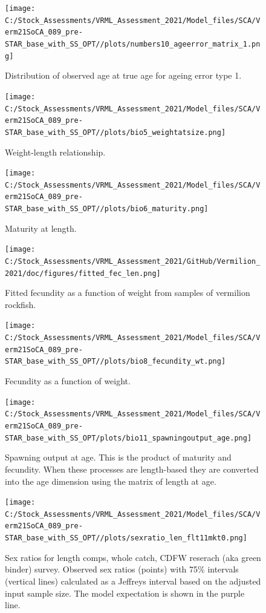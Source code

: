 \documentclass[
  english,
  a4paper,
]{article}
\begin{document}
\begin{figure}
\centering
\texttt{[image: C:/Stock\_Assessments/VRML\_Assessment\_2021/Model\_files/SCA/Verm21SoCA\_089\_pre-STAR\_base\_with\_SS\_OPT//plots/numbers10\_ageerror\_matrix\_1.png]}
\caption{Distribution of observed age at true age for ageing error type 1.\label{fig:ageerror}}
\end{figure}

\begin{figure}
\centering
\texttt{[image: C:/Stock\_Assessments/VRML\_Assessment\_2021/Model\_files/SCA/Verm21SoCA\_089\_pre-STAR\_base\_with\_SS\_OPT//plots/bio5\_weightatsize.png]}
\caption{Weight-length relationship.\label{fig:weightlength}}
\end{figure}

\begin{figure}
\centering
\texttt{[image: C:/Stock\_Assessments/VRML\_Assessment\_2021/Model\_files/SCA/Verm21SoCA\_089\_pre-STAR\_base\_with\_SS\_OPT//plots/bio6\_maturity.png]}
\caption{Maturity at length.\label{fig:maturity}}
\end{figure}

\begin{figure}
\centering
\texttt{[image: C:/Stock\_Assessments/VRML\_Assessment\_2021/GitHub/Vermilion\_2021/doc/figures/fitted\_fec\_len.png]}
\caption{Fitted fecundity as a function of weight from samples of vermilion rockfish.\label{fig:fitted-fecundity}}
\end{figure}

\begin{figure}
\centering
\texttt{[image: C:/Stock\_Assessments/VRML\_Assessment\_2021/Model\_files/SCA/Verm21SoCA\_089\_pre-STAR\_base\_with\_SS\_OPT//plots/bio8\_fecundity\_wt.png]}
\caption{Fecundity as a function of weight.\label{fig:fecundity}}
\end{figure}

\begin{figure}
\centering
\texttt{[image: C:/Stock\_Assessments/VRML\_Assessment\_2021/Model\_files/SCA/Verm21SoCA\_089\_pre-STAR\_base\_with\_SS\_OPT/plots/bio11\_spawningoutput\_age.png]}
\caption{Spawning output at age. This is the product of maturity and fecundity. When these processes are length-based they are converted into the age dimension using the matrix of length at age.\label{fig:spawnage}}
\end{figure}

\FloatBarrier

\begin{figure}
\centering
\texttt{[image: C:/Stock\_Assessments/VRML\_Assessment\_2021/Model\_files/SCA/Verm21SoCA\_089\_pre-STAR\_base\_with\_SS\_OPT//plots/sexratio\_len\_flt11mkt0.png]}
\caption{Sex ratios for length comps, whole catch, CDFW reserach (aka green binder) survey. Observed sex ratios (points) with 75\% intervals (vertical lines) calculated as a Jeffreys interval based on the adjusted input sample size. The model expectation is shown in the purple line.\label{fig:sexratio-CDFW-RESEARCH}}
\end{figure}
\end{document}
